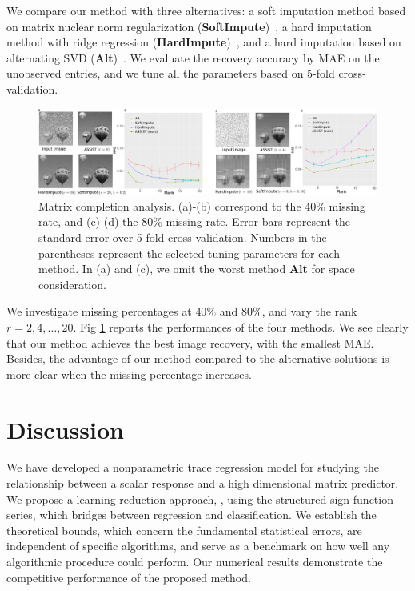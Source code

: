 \documentclass[aos]{imsart}
\theoremstyle{definition}
\def\NonparaM{\text{\bf \footnotesize ASSIST }}
\begin{document}
We compare our method with three alternatives: a soft imputation method based on matrix nuclear norm regularization ({\bf \footnotesize SoftImpute})~\cite{hastie2015matrix}, a hard imputation method with ridge regression ({\bf \footnotesize HardImpute})~\cite{mazumder2010spectral}, and a hard imputation based on alternating SVD ({\bf \footnotesize Alt})~\cite{rennie2005fast}. We evaluate the recovery accuracy by MAE on the unobserved entries, and we tune all the parameters based on 5-fold cross-validation. 

\begin{figure}[h!]
\includegraphics[width = \textwidth]{figure/completion.pdf}
\caption{Matrix completion analysis. (a)-(b) correspond to the 40\% missing rate, and (c)-(d) the 80\% missing rate. Error bars represent the standard error over 5-fold cross-validation. Numbers in the parentheses represent the selected tuning parameters for each method. In (a) and (c), we omit the worst method {\bf \scriptsize Alt} for space consideration.}
\label{fig:braincv}
\end{figure}

We investigate missing percentages at $40\%$ and $80\%$, and vary the rank $r=2,4,\ldots,20$. Fig \ref{fig:braincv} reports the performances of the four methods. We see clearly that our method achieves the best image recovery, with the smallest MAE. Besides, the advantage of our method compared to the alternative solutions is more clear when the missing percentage increases. 





\section{Discussion}
\label{sec:discussion}

We have developed a nonparametric trace regression model for studying the relationship between a scalar response and a high dimensional matrix predictor. We propose a learning reduction approach, \NonparaM, using the structured sign function series, which bridges between regression and classification. We establish the theoretical bounds, which concern the fundamental statistical errors, are independent of specific algorithms, and serve as a benchmark on how well any algorithmic procedure could perform. Our numerical results demonstrate the competitive performance of the proposed method.
\end{document}
